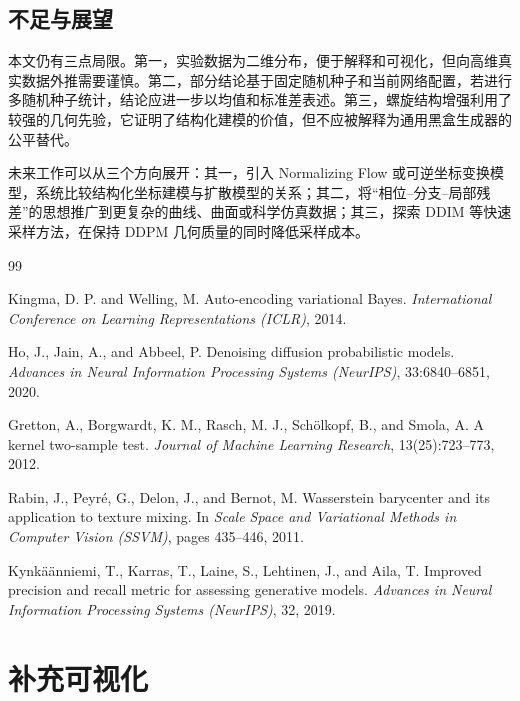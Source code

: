 \documentclass[10pt, a4paper, oneside]{ctexart}
\numberwithin{equation}{section}
\numberwithin{table}{section}
\numberwithin{figure}{section}
\begin{document}
\subsection{不足与展望}

本文仍有三点局限。第一，实验数据为二维分布，便于解释和可视化，但向高维真实数据外推需要谨慎。第二，部分结论基于固定随机种子和当前网络配置，若进行多随机种子统计，结论应进一步以均值和标准差表述。第三，螺旋结构增强利用了较强的几何先验，它证明了结构化建模的价值，但不应被解释为通用黑盒生成器的公平替代。

未来工作可以从三个方向展开：其一，引入 Normalizing Flow 或可逆坐标变换模型，系统比较结构化坐标建模与扩散模型的关系；其二，将“相位--分支--局部残差”的思想推广到更复杂的曲线、曲面或科学仿真数据；其三，探索 DDIM 等快速采样方法，在保持 DDPM 几何质量的同时降低采样成本。

\begin{thebibliography}{99}

Kingma, D. P. and Welling, M.
\newblock Auto-encoding variational Bayes.
\newblock \emph{International Conference on Learning Representations (ICLR)}, 2014.

Ho, J., Jain, A., and Abbeel, P.
\newblock Denoising diffusion probabilistic models.
\newblock \emph{Advances in Neural Information Processing Systems (NeurIPS)}, 33:6840--6851, 2020.

Gretton, A., Borgwardt, K. M., Rasch, M. J., Sch\"{o}lkopf, B., and Smola, A.
\newblock A kernel two-sample test.
\newblock \emph{Journal of Machine Learning Research}, 13(25):723--773, 2012.

Rabin, J., Peyr\'{e}, G., Delon, J., and Bernot, M.
\newblock Wasserstein barycenter and its application to texture mixing.
\newblock In \emph{Scale Space and Variational Methods in Computer Vision (SSVM)}, pages 435--446, 2011.

Kynk\"{a}\"{a}nniemi, T., Karras, T., Laine, S., Lehtinen, J., and Aila, T.
\newblock Improved precision and recall metric for assessing generative models.
\newblock \emph{Advances in Neural Information Processing Systems (NeurIPS)}, 32, 2019.

\end{thebibliography}

\appendix
\section{补充可视化}
\end{document}
